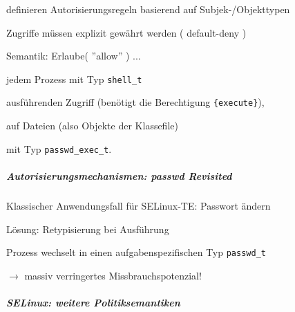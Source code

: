 \documentclass[a4paper]{article}
\begin{document}
\begin{multicols}{3}
    \begin{itemize*}
        \item
        definieren Autorisierungsregeln basierend auf Subjek-/Objekttypen
        \item
        Zugriffe müssen explizit gewährt werden ( default-deny )

        \item
        Semantik: Erlaube( ''allow'' ) ...
        \begin{itemize*}
            \item jedem Prozess mit Typ \texttt{shell\_t}
            \item ausführenden Zugriff (benötigt die Berechtigung \texttt{\{execute\}}),
            \item auf Dateien (also Objekte der Klassefile)
            \item mit Typ \texttt{passwd\_exec\_t}.
        \end{itemize*}
    \end{itemize*}


    \subparagraph{Autorisierungsmechanismen: passwd
        Revisited}

    Klassischer Anwendungsfall für SELinux-TE: Passwort ändern

    Lösung: Retypisierung bei Ausführung

    \begin{itemize*}
        \item
        Prozess wechselt in einen aufgabenspezifischen Typ \texttt{passwd\_t}
        \item
        $\rightarrow$  massiv verringertes
        Missbrauchspotenzial!
        \item
    \end{itemize*}


    \subparagraph{SELinux: weitere
        Politiksemantiken}


\end{multicols}
\end{document}
